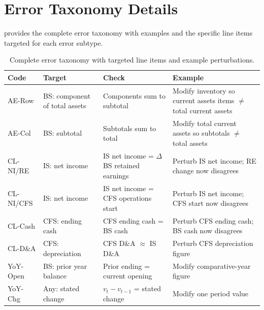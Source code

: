 \documentclass[11pt]{article}
\begin{document}
\section{Error Taxonomy Details}
\label{app:taxonomy}

 provides the complete error taxonomy with examples and the specific line items targeted for each error subtype.

\begin{table}[ht]
\centering
\small
\caption{Complete error taxonomy with targeted line items and example perturbations.}
\label{tab:taxonomy_full}
\begin{tabular}{p{}p{}p{}p{}}
\toprule
\textbf{Code} & \textbf{Target} & \textbf{Check} & \textbf{Example} \\
\midrule
AE-Row & BS: component of total assets & Components sum to subtotal & Modify inventory so current assets items $\neq$ total current assets \\
AE-Col & BS: subtotal & Subtotals sum to total & Modify total current assets so subtotals $\neq$ total assets \\
CL-NI/RE & IS: net income & IS net income = $\Delta$ BS retained earnings & Perturb IS net income; RE change now disagrees \\
CL-NI/CFS & IS: net income & IS net income = CFS operations start & Perturb IS net income; CFS start now disagrees \\
CL-Cash & CFS: ending cash & CFS ending cash = BS cash & Perturb CFS ending cash; BS cash now disagrees \\
CL-D\&A & CFS: depreciation & CFS D\&A $\approx$ IS D\&A & Perturb CFS depreciation figure \\
YoY-Open & BS: prior year balance & Prior ending = current opening & Modify comparative-year figure \\
YoY-Chg & Any: stated change & $v_t - v_{t-1}$ = stated change & Modify one period value \\
\bottomrule
\end{tabular}
\end{table}
\end{document}
